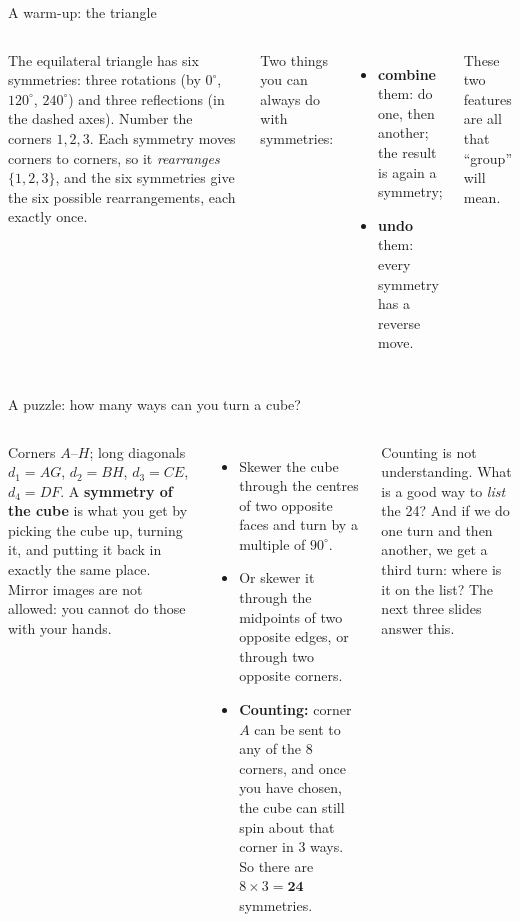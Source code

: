 \documentclass[aspectratio=169,10pt]{beamer}
\begin{document}
\begin{frame}{A warm-up: the triangle}
\begin{columns}[T]
\centering\scalebox{0.82}{\figtriangle}
\small The equilateral triangle has six symmetries: three rotations (by $0^\circ$, $120^\circ$, $240^\circ$) and three reflections (in the dashed axes). Number the corners $1,2,3$. Each symmetry moves corners to corners, so it \emph{rearranges} $\{1,2,3\}$, and the six symmetries give the six possible rearrangements, each exactly once.
\vspace{4pt}

Two things you can always do with symmetries:
\begin{itemize}
\item \textbf{combine} them: do one, then another; the result is again a symmetry;
\item \textbf{undo} them: every symmetry has a reverse move.
\end{itemize}
These two features are all that ``group'' will mean.
\end{columns}
\end{frame}

\begin{frame}{A puzzle: how many ways can you turn a cube?}
\begin{columns}[T]
\centering{}\par
{\scriptsize Corners $A$--$H$; long diagonals $d_1=AG$, $d_2=BH$, $d_3=CE$, $d_4=DF$.}
A \textbf{symmetry of the cube} is what you get by picking the cube up, turning it, and putting it back in exactly the same place. Mirror images are not allowed: you cannot do those with your hands.
\begin{itemize}
\item Skewer the cube through the centres of two opposite faces and turn by a multiple of $90^\circ$.
\item Or skewer it through the midpoints of two opposite edges, or through two opposite corners.
\item \textbf{Counting:} corner $A$ can be sent to any of the 8 corners, and once you have chosen, the cube can still spin about that corner in 3 ways. So there are $8\times3=\mathbf{24}$ symmetries.
\end{itemize}
\begin{pitbox}
Counting is not understanding. What is a good way to \emph{list} the 24? And if we do one turn and then another, we get a third turn: where is it on the list? The next three slides answer this.
\end{pitbox}
\end{columns}
\end{frame}
\end{document}
